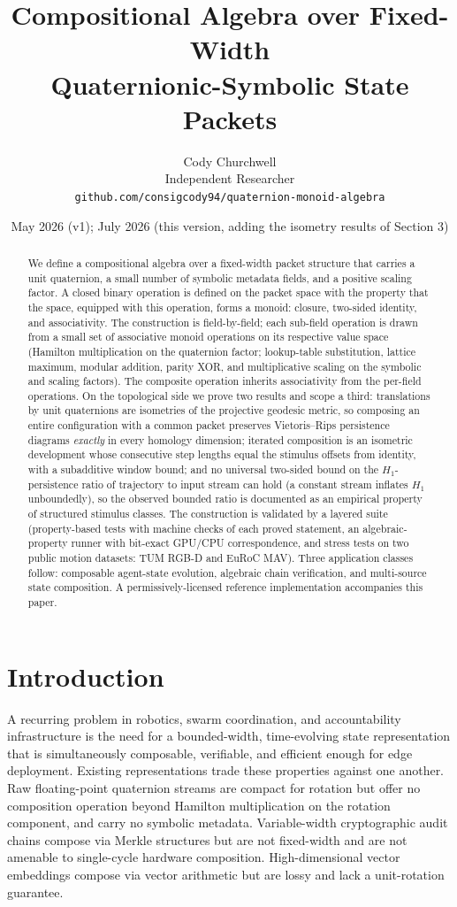 \documentclass[11pt]{article}
\title{Compositional Algebra over Fixed-Width\\
Quaternionic-Symbolic State Packets}
\author{Cody Churchwell\\
\small Independent Researcher\\
\small \texttt{github.com/consigcody94/quaternion-monoid-algebra}}
\date{May 2026 (v1); July 2026 (this version, adding the isometry results of Section 3)}
\begin{document}
\maketitle

\begin{abstract}
We define a compositional algebra over a fixed-width packet structure that
carries a unit quaternion, a small number of symbolic metadata fields, and a
positive scaling factor. A closed binary operation is defined on the packet
space with the property that the space, equipped with this operation, forms a
monoid: closure, two-sided identity, and associativity. The construction is
field-by-field; each sub-field operation is drawn from a small set of
associative monoid operations on its respective value space (Hamilton
multiplication on the quaternion factor; lookup-table substitution, lattice
maximum, modular addition, parity XOR, and multiplicative scaling on the
symbolic and scaling factors). The composite operation inherits associativity
from the per-field operations. On the topological side we prove two results
and scope a third: translations by unit quaternions are isometries of the
projective geodesic metric, so composing an entire configuration with a
common packet preserves Vietoris--Rips persistence diagrams \emph{exactly}
in every homology dimension; iterated composition is an isometric
development whose consecutive step lengths equal the stimulus offsets from
identity, with a subadditive window bound; and no universal two-sided bound
on the $H_1$-persistence ratio of trajectory to input stream can hold (a
constant stream inflates $H_1$ unboundedly), so the observed bounded ratio
is documented as an empirical property of structured stimulus classes. The
construction is validated by a layered suite (property-based tests with
machine checks of each proved statement, an algebraic-property runner with
bit-exact GPU/CPU correspondence, and stress tests on two public motion
datasets: TUM RGB-D and EuRoC MAV). Three application classes follow:
composable agent-state evolution, algebraic chain verification, and
multi-source state composition. A permissively-licensed reference
implementation accompanies this paper.
\end{abstract}

\section{Introduction}

A recurring problem in robotics, swarm coordination, and accountability
infrastructure is the need for a bounded-width, time-evolving state
representation that is simultaneously composable, verifiable, and efficient
enough for edge deployment. Existing representations trade these properties
against one another. Raw floating-point quaternion streams are compact for
rotation but offer no composition operation beyond Hamilton multiplication on
the rotation component, and carry no symbolic metadata. Variable-width
cryptographic audit chains compose via Merkle structures but are not
fixed-width and are not amenable to single-cycle hardware composition.
High-dimensional vector embeddings compose via vector arithmetic but are lossy
and lack a unit-rotation guarantee.
\end{document}
